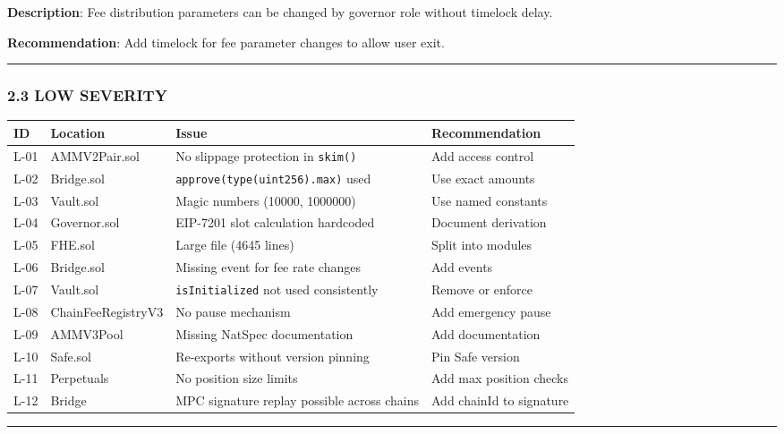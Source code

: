 \documentclass[
]{article}
\newcounter{none} %
\begin{document}
\textbf{Description}: Fee distribution parameters can be changed by
governor role without timelock delay.

\textbf{Recommendation}: Add timelock for fee parameter changes to allow
user exit.

\begin{center}\rule{0.5\linewidth}{0.5pt}\end{center}

\subsubsection{2.3 LOW SEVERITY}\label{23-low-severity}

{\def\LTcaptype{none} %
\begin{longtable}[]{@{}llll@{}}
\toprule\noalign{}
ID & Location & Issue & Recommendation \\
\midrule\noalign{}
\endhead
\bottomrule\noalign{}
\endlastfoot
L-01 & AMMV2Pair.sol & No slippage protection in \texttt{skim()} & Add
access control \\
L-02 & Bridge.sol & \texttt{approve(type(uint256).max)} used & Use exact
amounts \\
L-03 & Vault.sol & Magic numbers (10000, 1000000) & Use named
constants \\
L-04 & Governor.sol & EIP-7201 slot calculation hardcoded & Document
derivation \\
L-05 & FHE.sol & Large file (4645 lines) & Split into modules \\
L-06 & Bridge.sol & Missing event for fee rate changes & Add events \\
L-07 & Vault.sol & \texttt{isInitialized} not used consistently & Remove
or enforce \\
L-08 & ChainFeeRegistryV3 & No pause mechanism & Add emergency pause \\
L-09 & AMMV3Pool & Missing NatSpec documentation & Add documentation \\
L-10 & Safe.sol & Re-exports without version pinning & Pin Safe
version \\
L-11 & Perpetuals & No position size limits & Add max position checks \\
L-12 & Bridge & MPC signature replay possible across chains & Add
chainId to signature \\
\end{longtable}
}

\begin{center}\rule{0.5\linewidth}{0.5pt}\end{center}
\end{document}
